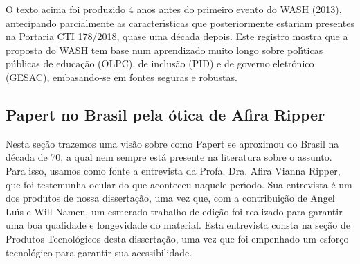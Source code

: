 \documentclass[
12pt,		%
openright,	%
twoside,  %
a4paper,			%
chapter=TITLE,		%
english,			%
french,				%
spanish,			%
brazil				%
]{USPSC-classe/USPSC}
\begin{document}
\noindent\begin{center}\mbox{\centering{}}\end{center}


O texto acima foi produzido 4 anos antes do primeiro evento do WASH (2013), antecipando parcialmente as caracter\'{\i}sticas que posteriormente estariam presentes na Portaria CTI 178/2018, quase uma d\'ecada depois. Este registro mostra que a proposta do WASH tem base num aprendizado muito longo sobre pol\'{\i}ticas p\'ublicas de educa\c{c}\~ao (OLPC), de inclus\~ao (PID) e de governo eletr\^onico (GESAC), embasando-se em fontes seguras e robustas.




\subsection[Papert no Brasil pela \'otica de Afira Ripper]{Papert no Brasil pela \'otica de Afira Ripper}\label{Papert no Brasil pela \'otica de Afira Ripper}
Nesta se\c{c}\~ao trazemos uma vis\~ao sobre como Papert se aproximou do Brasil na d\'ecada de 70, a qual nem sempre est\'a presente na literatura sobre o assunto. Para isso, usamos como fonte a entrevista da Profa. Dra. Afira Vianna Ripper, que foi testemunha ocular do que aconteceu naquele per\'{\i}odo. Sua entrevista \'e um dos produtos de nossa disserta\c{c}\~ao, uma vez que, com a contribui\c{c}\~ao de Angel Lu\'{\i}s e Will Namen, um esmerado trabalho de edi\c{c}\~ao foi realizado para garantir uma boa qualidade e longevidade do material. Esta entrevista consta na se\c{c}\~ao de Produtos Tecnol\'ogicos desta disserta\c{c}\~ao, uma vez que foi empenhado um esfor\c{c}o tecnol\'ogico para garantir sua acessibilidade.
\end{document}
